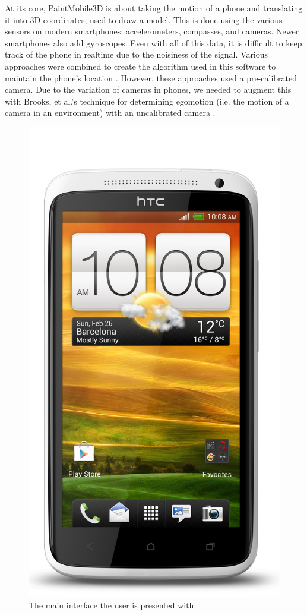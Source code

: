 \documentclass{chi-ext}
\begin{document}
At its core, PaintMobile3D is about taking the motion of a phone and
translating it into 3D coordinates, used to draw a model. This is done using
the various sensors on modern smartphones: accelerometers, compasses, and
cameras. Newer smartphones also add gyroscopes. Even with all of this data, it
is difficult to keep track of the phone in realtime due to the noisiness of
the signal. Various approaches were combined to create the algorithm used in
this software to maintain the phone's location \cite{voigt2011robust}
\cite{hol2007robust}. However, these approaches used a pre-calibrated camera.
Due to the variation of cameras in phones, we needed to augment this with
Brooks, et al.'s technique for determining egomotion (i.e. the motion of a
camera in an environment) with an uncalibrated camera
\cite{brooks1997determining}.

\pagebreak

\begin{figure} %
\parbox{1\columnwidth}{

\centering \includegraphics[width=0.8\columnwidth]{onex.jpg} \caption{The main
interface the user is presented with} \label{fig:maininterface} } \end{figure}
\end{document}
